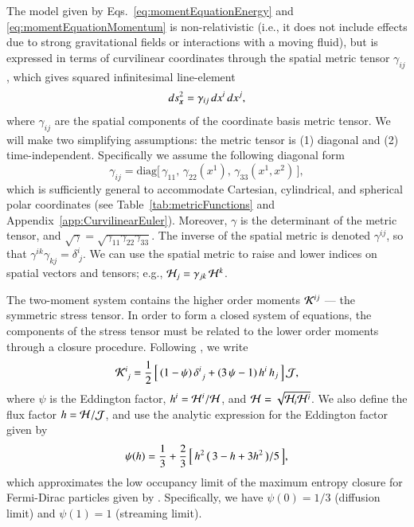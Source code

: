\documentclass[11pt,letterpaper,twoside,english,final]{article}
\begin{document}
The model given by Eqs.~\eqref{eq:momentEquationEnergy} and \eqref{eq:momentEquationMomentum} is non-relativistic (i.e., it does not include effects due to strong gravitational fields or interactions with a moving fluid), but is expressed in terms of curvilinear coordinates through the spatial metric tensor $\gamma_{ij}$, which gives squared infinitesimal line-element
\begin{equation}
  ds_{\boldsymbol{x}}^{2}=\gamma_{ij}\,dx^{i}\,dx^{j},
\end{equation}
where $\gamma_{ij}$ are the spatial components of the coordinate basis metric tensor.  
We will make two simplifying assumptions: the metric tensor is (1) diagonal and (2) time-independent.  
Specifically we assume the following diagonal form
\begin{equation}
  \gamma_{ij}
  =\mbox{diag}\big[\,\gamma_{11},\,\gamma_{22}(x^{1}),\,\gamma_{33}(x^{1},x^{2})\,\big], 
  \label{eq:threeMetric}
\end{equation}
which is sufficiently general to accommodate Cartesian, cylindrical, and spherical polar coordinates (see Table~\ref{tab:metricFunctions} and Appendix~\ref{app:CurvilinearEuler}).  
Moreover, $\gamma$ is the determinant of the metric tensor, and $\sqrt{\gamma}=\sqrt{\gamma_{11}\gamma_{22}\gamma_{33}}$.  
The inverse of the spatial metric is denoted $\gamma^{ij}$, so that $\gamma^{ik}\gamma_{kj}=\delta^{i}_{~j}$.  
We can use the spatial metric to raise and lower indices on spatial vectors and tensors; e.g., $\mathcal{H}_{j}=\gamma_{jk}\,\mathcal{H}^{k}$.  

The two-moment system contains the higher order moments $\mathcal{K}^{ij}$ --- the symmetric stress tensor.  
In order to form a closed system of equations, the components of the stress tensor must be related to the lower order moments through a closure procedure.  
Following \citet{levermore_1984}, we write
\begin{equation}
  \mathcal{K}^{i}_{~j}
  =\frac{1}{2}\,\Big[\,(1-\psi)\,\delta^{i}_{~j}+(3\,\psi-1)\,h^{i}\,h_{j}\,\Big]\,\mathcal{J},
  \label{eq:stressTensor}
\end{equation}
where $\psi$ is the Eddington factor, $h^{i}=\mathcal{H}^{i}/\mathcal{H}$, and $\mathcal{H}=\sqrt{\mathcal{H}_{i}\mathcal{H}^{i}}$.  
We also define the flux factor $h=\mathcal{H}/\mathcal{J}$, and use the analytic expression for the Eddington factor \citep{minerbo_1978} given by 
\begin{equation}
  \psi(h)=\frac{1}{3}+\frac{2}{3}\,\Big[\,h^{2}\,\big(\,3-h+3h^{2}\,\big)/5\,\Big],
  \label{eq:eddingtonFactor}
\end{equation}
which approximates the low occupancy limit of the maximum entropy closure for Fermi-Dirac particles given by \citet{cernohorskyBludman_1994}.  
Specifically, we have $\psi(0)=1/3$ (diffusion limit) and $\psi(1)=1$ (streaming limit).  
\end{document}
